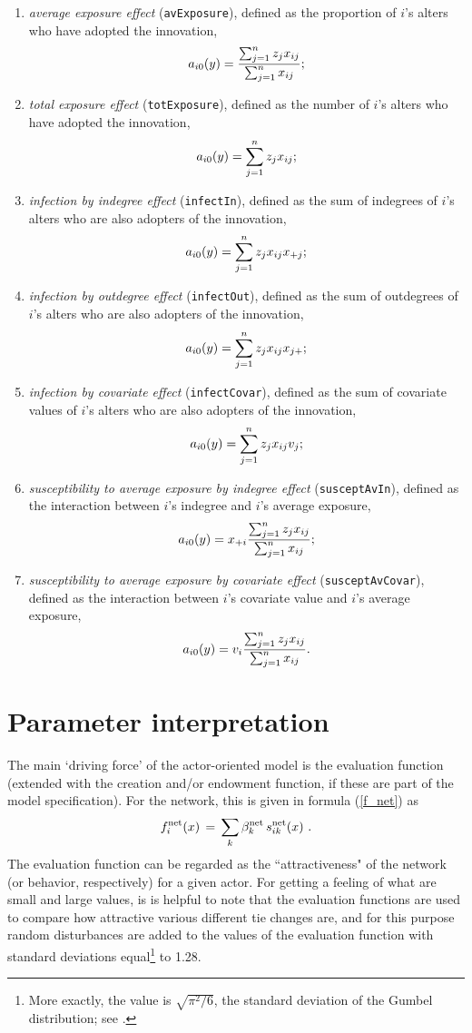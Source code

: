 \documentclass[a4paper,fleqn,11pt]{article}
\newcommand{\+}{\, + \,}
\newcommand{\vit}{\theenumi}
\begin{document}
\begin{enumerate}
\item \emph{average exposure effect} (\verb|avExposure|),
  defined as the proportion of $i$'s alters who have adopted the innovation,
\[
a_{i\vit}(y) = \frac{\sum_{j=1}^n z_j x_{ij} }{\sum_{j=1}^n x_{ij}};
\]
\item \emph{total exposure effect} (\verb|totExposure|), defined as the
 number of $i$'s alters who have adopted the innovation,
\[
a_{i\vit}(y) = \sum_{j=1}^n z_j x_{ij} ;
\]
\item \emph{infection by indegree effect} (\verb|infectIn|),
  defined as the sum of indegrees of $i$'s alters who are also adopters of the innovation,
\[
a_{i\vit}(y)=\sum_{j=1}^n z_j x_{ij}x_{+j};
\]
\item \emph{infection by outdegree effect} (\verb|infectOut|),
 defined as the sum of outdegrees of $i$'s alters who are also adopters of the innovation,
\[
a_{i\vit}(y)=\sum_{j=1}^n z_j x_{ij}x_{j+};
\]
\item \emph{infection by covariate effect} (\verb|infectCovar|),
 defined as the sum of covariate values of $i$'s alters who are also adopters of the innovation,
\[
a_{i\vit}(y)=\sum_{j=1}^n z_j x_{ij} v_j;
\]
\item \emph{susceptibility to average exposure by indegree effect} (\verb|susceptAvIn|),
 defined as the interaction between $i$'s indegree and $i$'s average exposure,
\[
a_{i\vit}(y)=x_{+i} \frac{\sum_{j=1}^n z_j x_{ij}}{\sum_{j=1}^n x_{ij}};
\]
\item \emph{susceptibility to average exposure by covariate effect} (\verb|susceptAvCovar|),
  defined as the interaction between $i$'s covariate value and $i$'s  average exposure,
\[
a_{i\vit}(y)=v_{i} \frac{\sum_{j=1}^n z_j x_{ij}}{\sum_{j=1}^n x_{ij}}.
\]

\end{enumerate}



\newpage
\section{Parameter interpretation}
\label{S_interpret}

The main `driving force' of the actor-oriented model
is the evaluation function
(extended with the creation and/or endowment function, if these are
part of the model specification).
For the network, this is given in formula (\ref{f_net}) as
\[
f^{\rm net}_i(x) \, = \, \sum_k \beta^{\rm net}_k \, s^{\rm net}_{ik}(x)   \ .
\]
The evaluation function can be regarded as the ``attractiveness"
of the network (or behavior, respectively) for a given actor.
For getting a feeling of what are small and large values,
is is helpful to note that the evaluation functions are
used to compare how attractive various different tie changes are,
and for this purpose random disturbances are added
to the values of the evaluation function with standard deviations
equal\footnote{More exactly, the value is $\sqrt{\pi^2/6}$,
the standard deviation of the Gumbel
distribution; see \citet{Snijders01}.} to 1.28.
\end{document}
